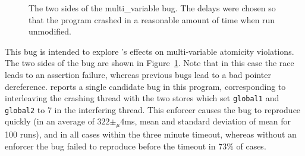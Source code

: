 \begin{figure}
  \hfill
  \caption{The two sides of the multi\_variable bug. The delays were
    chosen so that the program crashed in a reasonable amount of time
    when run unmodified.}
  \label{fig:eval:multi_variable}
\end{figure}

This bug is intended to explore {\technique}'s effects on
multi-variable atomicity violations.  The two sides of the bug are
shown in Figure~\ref{fig:eval:multi_variable}.  Note that in this case
the race leads to an assertion failure, whereas previous bugs lead to
a bad pointer dereference.  {\Technique} reports a single candidate
bug in this program, corresponding to interleaving the crashing thread
with the two stores which set \texttt{global1} and \texttt{global2} to
7 in the interfering thread.  This enforcer causes the bug to
reproduce quickly (in an average of $322 \pm_\mu 4$ms, mean and standard
deviation of mean for 100 runs), and in all cases within the three
minute timeout, whereas without an enforcer the bug failed to
reproduce before the timeout in 73\% of cases.

